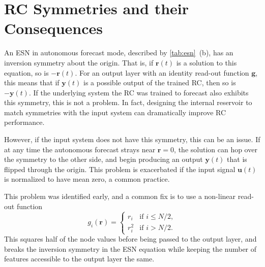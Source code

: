 \section{RC Symmetries and their Consequences}

An ESN in autonomous forecast mode, described by \cref{tab:esn}~(b),
has an inversion symmetry about the origin. That is, if $\bm{r}(t)$ is
a solution to this equation, so is $-\bm{r}(t)$. For an output layer
with an identity read-out function $\bm{g}$, this means that if
$\bm{y}(t)$ is a possible output of the trained RC, then so is
$-\bm{y}(t)$. If the underlying system the RC was trained to forecast
also exhibits this symmetry, this is not a problem. In fact, designing
the internal reservoir to match symmetries with the input system can
dramatically improve RC performance\cite{barbosa2021}.

However, if the input system does not have this symmetry, this can be
an issue. If at any time the autonomous forecast strays near $\bm{r} =
0$, the solution can hop over the symmetry to the other side, and
begin producing an output $\bm{y}(t)$ that is flipped through the
origin. This problem is exacerbated if the input signal $\bm{u}(t)$ is
normalized to have mean zero, a common practice.

This problem was identified early, and a common fix\cite{pathak2017,herteux2020}
is to use a non-linear read-out function
\begin{equation}
  g_i(\bm{r}) = \begin{cases}
    r_i & \text{if } i \leq N / 2, \\
    r_i^2 & \text{if } i > N / 2.
  \end{cases}
  \label{eq:esn-break-sym}
\end{equation}
This squares half of the node values before being passed
to the output layer, and breaks the inversion symmetry in the ESN
equation while keeping the number of features accessible to the output
layer the same.

